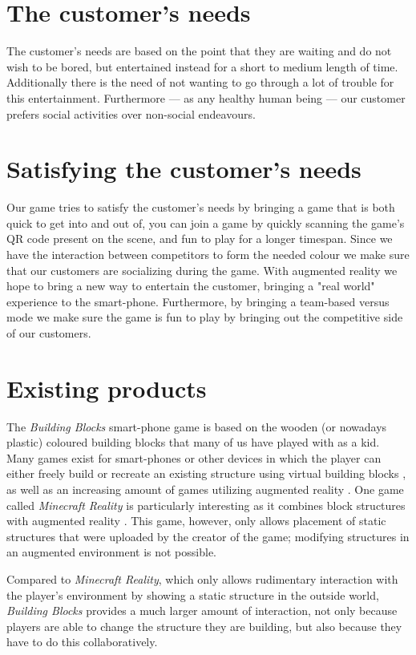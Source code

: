 \documentclass[a4paper,titlepage]{scrartcl}
\begin{document}
\section{The customer's needs}
The customer's needs are based on the point that they are waiting and do not wish to be bored, but entertained instead for a short to medium length of time. 
Additionally there is the need of not wanting to go through a lot of trouble for this entertainment.
Furthermore — as any healthy human being — our customer prefers social activities over non-social endeavours.


\section{Satisfying the customer's needs}
Our game tries to satisfy the customer's needs by bringing a game that is both quick to get into and out of, you can join a game by quickly scanning the game's QR code present on the scene, and fun to play for a longer timespan. Since we have the interaction between competitors to form the needed colour we make sure that our customers are socializing during the game. With augmented reality we hope to bring a new way to entertain the customer, bringing a "real world" experience to the smart-phone. Furthermore, by bringing a team-based versus mode we make sure the game is fun to play by bringing out the competitive side of our customers.

 
\section{Existing products}
The \textit{Building Blocks} smart-phone game is based on the wooden (or nowadays plastic) coloured building blocks that many of us have played with as a kid. Many games exist for smart-phones or other devices in which the player can either freely build or recreate an existing structure using virtual building blocks \cite{blocksworldhd}\cite{minecraft}, as well as an increasing amount of games utilizing augmented reality \cite{ohan}\cite{zombierun}\cite{coderunner}. One game called \textit{Minecraft Reality} is particularly interesting as it combines block structures with augmented reality \cite{minecraftreality}. This game, however, only allows placement of static structures that were uploaded by the creator of the game; modifying structures in an augmented environment is not possible.

Compared to \textit{Minecraft Reality}, which only allows rudimentary interaction with the player's environment by showing a static structure in the outside world, \textit{Building Blocks} provides a much larger amount of interaction, not only because players are able to change the structure they are building, but also because they have to do this collaboratively.
\end{document}
